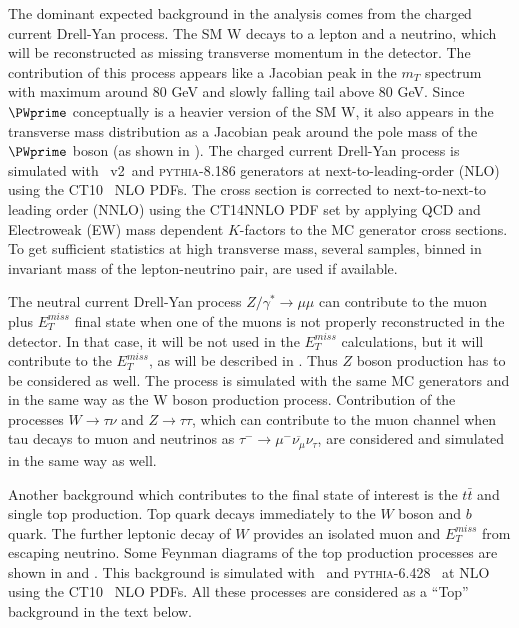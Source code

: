 The dominant expected background in the analysis comes from the charged current Drell-Yan process.
The SM W decays to a lepton and a neutrino, which will be reconstructed as missing transverse momentum in the detector.
The contribution of this process appears like a Jacobian peak in the $m_T$ spectrum
with maximum around 80 GeV and slowly falling tail above 80 GeV.
Since $\PWprime$ conceptually is a heavier version of the SM W, it also appears in the transverse mass distribution as a Jacobian peak around the pole mass of the $\PWprime$ boson (as shown in ). 
The charged current Drell-Yan process is simulated with \powhegbox\ v2~\cite{Alioli:2010xd}and {\scshape pythia-8.186} generators at next-to-leading-order (NLO) using the CT10~\cite{CT10} NLO PDFs. 
The cross section is corrected to next-to-next-to leading order (NNLO) using the CT14NNLO PDF set by applying QCD and Electroweak (EW) mass dependent $K$-factors to the MC generator cross sections.
To get sufficient statistics at high transverse mass, several samples, binned in invariant mass of the lepton-neutrino pair, are used if available.

The neutral current Drell-Yan process $Z/\gamma^* \to \mu \mu$ can contribute to the muon plus $E_T^{miss}$ final state when one of the muons is not properly reconstructed in the detector. 
In that case, it will be not used in the $E_T^{miss}$ calculations, but it will contribute to the $E_T^{miss}$, as will be described in .
Thus $Z$ boson production has to be considered as well. The process is simulated with the same MC generators and in the same way as the W boson production process.
Contribution of the processes $W \to \tau \nu$ and $Z \to \tau \tau$, which can contribute to the muon channel 
when tau decays to muon and neutrinos as $\tau^{-} \to \mu^{-} \overline{\nu_{\mu}} \nu_{\tau}$, are considered and simulated in the same way as well.

Another background which contributes to the final state of interest is the $t\bar{t}$ and single top production.
Top quark decays immediately to the $W$ boson and $b$ quark. The further leptonic decay of $W$ provides an isolated muon and $E_T^{miss}$ from escaping neutrino.
Some Feynman diagrams of the top production processes are shown in  and .
This background is simulated with \powhegbox\ and {\scshape pythia-6.428}~\cite{Pythia} at NLO using the CT10~\cite{CT10} NLO PDFs.
All these processes are considered as a ``Top'' background in the text below.

